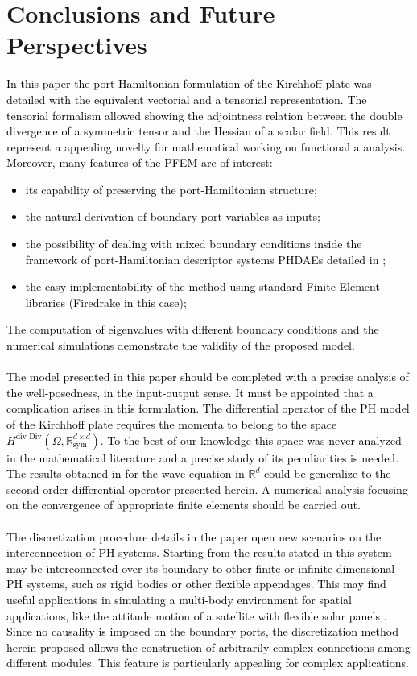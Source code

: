 \documentclass[11pt]{article}
\newcommand{\revOne}[1]{\textcolor{black}{#1}}
\begin{document}
	\section*{Conclusions and Future Perspectives}
	\revOne{
		In this paper the port-Hamiltonian formulation of the Kirchhoff plate was detailed with the equivalent vectorial and a tensorial representation. The tensorial formalism allowed showing the adjointness relation between the double divergence of a symmetric tensor and the Hessian of a scalar field. This result represent a appealing novelty for mathematical working on functional a analysis. Moreover, many features of the PFEM are of interest:
		\begin{itemize}
			\item its capability of preserving the port-Hamiltonian structure;
			\item the natural derivation of boundary port variables as inputs;
			\item the possibility of dealing with mixed boundary conditions inside the framework of  port-Hamiltonian descriptor systems PHDAEs  detailed in \cite{beattie2018linear};
			\item the easy implementability of the method using standard Finite Element libraries (Firedrake \cite{firedrake} in this case);
		\end{itemize}   
		The computation of eigenvalues with different boundary conditions and the numerical simulations demonstrate the validity of the proposed model. \\ \\
		The model presented in this paper should be completed with a precise analysis of the well-posedness, in the input-output sense. It must be appointed that a complication arises in this formulation. The differential operator of the PH model of the Kirchhoff plate requires the momenta to belong to the space $H^{\text{div Div}}(\Omega, \mathbb{R}^{d \times d}_{\text{sym}})$. To the best of our knowledge this space was never analyzed in the mathematical literature and a precise study of its peculiarities is needed. The results obtained in \cite{waveEqZwart} for the wave equation in $\mathbb{R}^d$ could be generalize to the second order differential operator presented herein. A numerical analysis focusing on the convergence of appropriate finite elements should be carried out. \\ \\
		The discretization procedure details in the paper open new scenarios on the interconnection of PH systems. Starting from the results stated in \cite{ShaftIntInfinite} this system may be interconnected over its boundary to other finite or infinite dimensional PH systems, such as rigid bodies or other flexible appendages. This may find useful applications in simulating a multi-body environment for spatial applications, like the attitude motion of a satellite with flexible solar panels \cite{aoues:hal-01738092}. Since no causality is imposed on the boundary ports, the discretization method herein proposed allows the construction of arbitrarily complex connections among different modules. This feature is particularly appealing for complex applications.
	}
	
\end{document}
